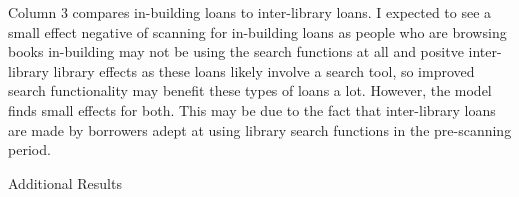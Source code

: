 \documentclass{article}
\begin{document}
Column 3 compares in-building loans to inter-library loans. I expected to see a small effect negative of scanning for in-building loans as people who are browsing books in-building may not be using the search functions at all and positve inter-library library effects as these loans likely involve a search tool, so improved search functionality may benefit these types of loans a lot. However, the model finds small effects for both.  This may be due to the fact that inter-library loans are made by borrowers adept at using library search functions in the pre-scanning period.

\begin{table}[htbp]
   \centering
   \caption{Additional Results}
  
   \label{tab:booktabs}
\end{table}
\end{document}

